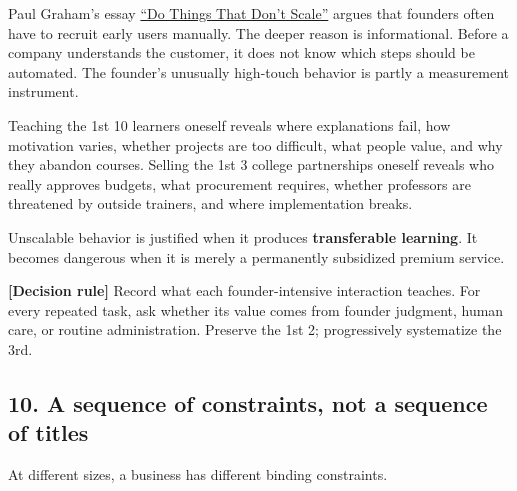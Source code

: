 Paul Graham's essay \href{https://paulgraham.com/\allowbreak ds.html}{``Do Things That Don't Scale''} argues that founders often have to recruit early users manually. The deeper reason is informational. Before a company understands the customer, it does not know which steps should be automated. The founder's unusually high-touch behavior is partly a measurement instrument.

Teaching the 1st 10 learners oneself reveals where explanations fail, how motivation varies, whether projects are too difficult, what people value, and why they abandon courses. Selling the 1st 3 college partnerships oneself reveals who really approves budgets, what procurement requires, whether professors are threatened by outside trainers, and where implementation breaks.

Unscalable behavior is justified when it produces \textbf{transferable learning}. It becomes dangerous when it is merely a permanently subsidized premium service.

\textbf{\textbf{[Decision rule]}} Record what each founder-intensive interaction teaches. For every repeated task, ask whether its value comes from founder judgment, human care, or routine administration. Preserve the 1st 2; progressively systematize the 3rd.

\subsection{10. A sequence of constraints, not a sequence of titles}

At different sizes, a business has different binding constraints.

